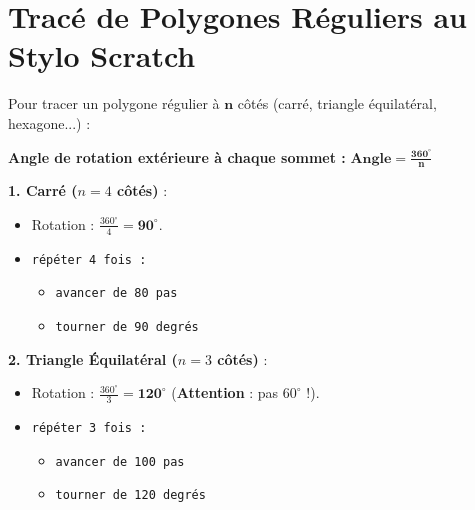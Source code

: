 \section{Tracé de Polygones Réguliers au Stylo Scratch}

\begin{cadredef}
Pour tracer un polygone régulier à $\mathbf{n}$ côtés (carré, triangle équilatéral, hexagone...) :
\begin{center}
\textbf{Angle de rotation extérieure à chaque sommet :} \quad 
$\mathbf{\text{Angle} = \frac{360^\circ}{n}}$
\end{center}
\end{cadredef}

\begin{cadremethode}
\noindent
\begin{minipage}[c]{0.48\linewidth}
\textbf{1. Carré ($n = 4$ côtés)} :
\begin{itemize}[leftmargin=1.2em, itemsep=1pt]
    \item Rotation : $\frac{360^\circ}{4} = \mathbf{90^\circ}$.
    \item \texttt{répéter 4 fois :}
    \begin{itemize}
        \item \texttt{avancer de 80 pas}
        \item \texttt{tourner de 90 degrés}
    \end{itemize}
\end{itemize}
\end{minipage}\hfill
\begin{minipage}[c]{0.48\linewidth}
\textbf{2. Triangle Équilatéral ($n = 3$ côtés)} :
\begin{itemize}[leftmargin=1.2em, itemsep=1pt]
    \item Rotation : $\frac{360^\circ}{3} = \mathbf{120^\circ}$ (\textbf{Attention} : pas $60^\circ$ !).
    \item \texttt{répéter 3 fois :}
    \begin{itemize}
        \item \texttt{avancer de 100 pas}
        \item \texttt{tourner de 120 degrés}
    \end{itemize}
\end{itemize}
\end{minipage}
\end{cadremethode}

